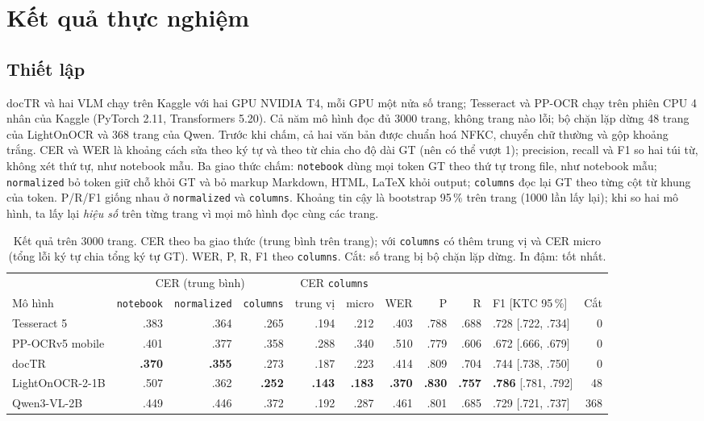 \documentclass[10pt,a4paper]{article}
\begin{document}
\section{Kết quả thực nghiệm}
\subsection{Thiết lập}
docTR và hai VLM chạy trên Kaggle với hai GPU NVIDIA T4, mỗi GPU một nửa số trang; Tesseract và PP-OCR chạy
trên phiên CPU 4 nhân của Kaggle (PyTorch 2.11, Transformers 5.20). Cả năm mô hình đọc đủ 3000 trang, không trang
nào lỗi; bộ chặn lặp dừng 48 trang của LightOnOCR và 368 trang của Qwen. Trước khi chấm, cả hai văn bản được
chuẩn hoá NFKC, chuyển chữ thường và gộp khoảng trắng. CER và WER là khoảng cách sửa theo ký tự và theo từ chia
cho độ dài GT (nên có thể vượt 1); precision, recall và F1 so hai túi từ, không xét thứ tự, như notebook mẫu.
Ba giao thức chấm: \texttt{notebook} dùng mọi token GT theo thứ tự trong file, như notebook mẫu;
\texttt{normalized} bỏ token giữ chỗ khỏi GT và bỏ markup Markdown, HTML, LaTeX khỏi output; \texttt{columns}
đọc lại GT theo từng cột từ khung của token. P/R/F1 giống nhau ở \texttt{normalized} và \texttt{columns}.
Khoảng tin cậy là bootstrap 95\,\% trên trang (1000 lần lấy lại); khi so hai mô hình, ta lấy lại \emph{hiệu số}
trên từng trang vì mọi mô hình đọc cùng các trang.

\begin{table}[t]
\centering\footnotesize
\caption{Kết quả trên 3000 trang. CER theo ba giao thức (trung bình trên trang); với \texttt{columns} có thêm
trung vị và CER micro (tổng lỗi ký tự chia tổng ký tự GT). WER, P, R, F1 theo \texttt{columns}. Cắt: số trang
bị bộ chặn lặp dừng. In đậm: tốt nhất.}
\label{tab:main}
\setlength{\tabcolsep}{4.5pt}
\begin{tabular}{@{}lrrrrrrrrlr@{}}
\toprule
& \multicolumn{3}{c}{CER (trung bình)} & \multicolumn{2}{c}{CER \texttt{columns}} & & & & & \\
\cmidrule(lr){2-4}\cmidrule(lr){5-6}
Mô hình & \texttt{notebook} & \texttt{normalized} & \texttt{columns} & trung vị & micro & WER & P & R & F1 [KTC 95\,\%] & Cắt \\
\midrule
Tesseract 5      & .383 & .364 & .265 & .194 & .212 & .403 & .788 & .688 & .728 [.722, .734] & 0 \\
PP-OCRv5 mobile  & .401 & .377 & .358 & .288 & .340 & .510 & .779 & .606 & .672 [.666, .679] & 0 \\
docTR            & \textbf{.370} & \textbf{.355} & .273 & .187 & .223 & .414 & .809 & .704 & .744 [.738, .750] & 0 \\
LightOnOCR-2-1B  & .507 & .362 & \textbf{.252} & \textbf{.143} & \textbf{.183} & \textbf{.370} & \textbf{.830} & \textbf{.757} & \textbf{.786} [.781, .792] & 48 \\
Qwen3-VL-2B      & .449 & .446 & .372 & .192 & .287 & .461 & .801 & .685 & .729 [.721, .737] & 368 \\
\bottomrule
\end{tabular}
\end{table}
\end{document}
